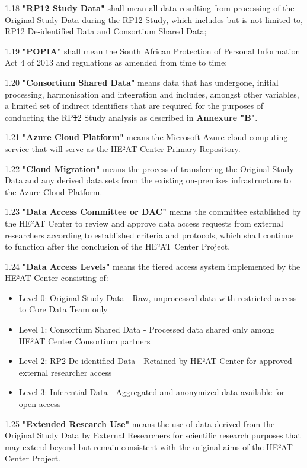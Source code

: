 \documentclass[12pt,letterpaper]{article}
\newcommand{\deleted}[1]{\textcolor{deletecolor}{\sout{#1}}}
\newcommand{\added}[1]{\textcolor{addcolor}{#1}}
\begin{document}
1.18 \textbf{"RP\deleted{1}\added{2} Study Data"} shall mean all data resulting from processing of the Original Study Data during the RP\deleted{1}\added{2} Study, which includes but is not limited to, RP\deleted{1}\added{2} De-identified Data and Consortium Shared Data;

1.19 \textbf{"POPIA"} shall mean the South African Protection of Personal Information Act 4 of 2013 and regulations as amended from time to time;

1.20 \textbf{"Consortium Shared Data"} means data that has undergone, initial processing, harmonisation and integration and includes, amongst other variables, a limited set of indirect identifiers that are required for the purposes of conducting the RP\deleted{1}\added{2} Study analysis as described in \textbf{Annexure "B"}.

\added{1.21 \textbf{"Azure Cloud Platform"} means the Microsoft Azure cloud computing service that will serve as the HE²AT Center Primary Repository.}

\added{1.22 \textbf{"Cloud Migration"} means the process of transferring the Original Study Data and any derived data sets from the existing on-premises infrastructure to the Azure Cloud Platform.}

\added{1.23 \textbf{"Data Access Committee or DAC"} means the committee established by the HE²AT Center to review and approve data access requests from external researchers according to established criteria and protocols, which shall continue to function after the conclusion of the HE²AT Center Project.}

\added{1.24 \textbf{"Data Access Levels"} means the tiered access system implemented by the HE²AT Center consisting of:
\begin{itemize}
   \item Level 0: Original Study Data - Raw, unprocessed data with restricted access to Core Data Team only
   \item Level 1: Consortium Shared Data - Processed data shared only among HE²AT Center Consortium partners
   \item Level 2: RP2 De-identified Data - Retained by HE²AT Center for approved external researcher access
   \item Level 3: Inferential Data - Aggregated and anonymized data available for open access
\end{itemize}}

\added{1.25 \textbf{"Extended Research Use"} means the use of data derived from the Original Study Data by External Researchers for scientific research purposes that may extend beyond but remain consistent with the original aims of the HE²AT Center Project.}
\end{document}
